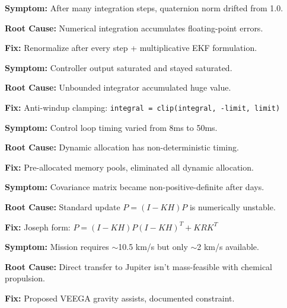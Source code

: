 \documentclass[11pt,a4paper]{article}
\begin{document}
\begin{errorbox}[title=\faExclamationTriangle~Error 2: Quaternion Normalization Drift]
\textbf{Symptom:} After many integration steps, quaternion norm drifted from 1.0.

\textbf{Root Cause:} Numerical integration accumulates floating-point errors.

\textbf{Fix:} Renormalize after every step + multiplicative EKF formulation.
\end{errorbox}

\begin{errorbox}[title=\faExclamationTriangle~Error 3: Integrator Windup]
\textbf{Symptom:} Controller output saturated and stayed saturated.

\textbf{Root Cause:} Unbounded integrator accumulated huge value.

\textbf{Fix:} Anti-windup clamping: \texttt{integral = clip(integral, -limit, limit)}
\end{errorbox}

\begin{errorbox}[title=\faExclamationTriangle~Error 4: malloc() Timing Jitter]
\textbf{Symptom:} Control loop timing varied from 8ms to 50ms.

\textbf{Root Cause:} Dynamic allocation has non-deterministic timing.

\textbf{Fix:} Pre-allocated memory pools, eliminated all dynamic allocation.
\end{errorbox}

\begin{errorbox}[title=\faExclamationTriangle~Error 5: EKF Numerical Instability]
\textbf{Symptom:} Covariance matrix became non-positive-definite after days.

\textbf{Root Cause:} Standard update $P = (I-KH)P$ is numerically unstable.

\textbf{Fix:} Joseph form: $P = (I-KH)P(I-KH)^T + KRK^T$
\end{errorbox}

\begin{errorbox}[title=\faExclamationTriangle~Error 6: Propellant Budget Exceeded]
\textbf{Symptom:} Mission requires $\sim$10.5 km/s but only $\sim$2 km/s available.

\textbf{Root Cause:} Direct transfer to Jupiter isn't mass-feasible with chemical propulsion.

\textbf{Fix:} Proposed VEEGA gravity assists, documented constraint.
\end{errorbox}
\end{document}
